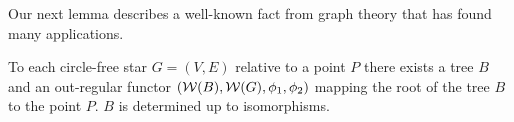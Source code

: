 Our next lemma describes a well-known fact from graph theory that has found many
applications.

\begin{lemma}
To each circle-free star $G = (V, E)$ relative to a point $P$ there exists a
tree $B$ and an out-regular functor $(\mbox{$\mathcal{W}(B)$}, \mbox{$\mathcal{W}(G)$},
\phi_1, \phi_2)$ mapping the root of the tree $B$ to the point $P$. $B$ is
determined up to isomorphisms.
\end{lemma}



































